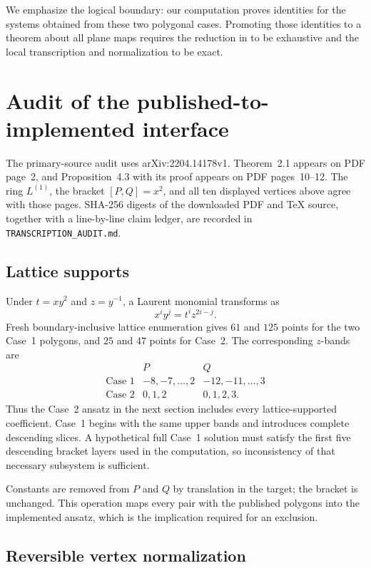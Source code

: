 \documentclass[11pt,a4paper]{article}
\theoremstyle{remark}
\begin{document}
We emphasize the logical boundary: our computation proves identities for the systems obtained from these two polygonal cases. Promoting those identities to a theorem about all plane maps requires the reduction in \cite{GGHV2022} to be exhaustive and the local transcription and normalization to be exact.

\section{Audit of the published-to-implemented interface}

The primary-source audit uses arXiv:2204.14178v1. Theorem~2.1 appears on PDF page~2, and Proposition~4.3 with its proof appears on PDF pages~10--12. The ring $L^{(1)}$, the bracket $[P,Q]=x^2$, and all ten displayed vertices above agree with those pages. SHA-256 digests of the downloaded PDF and TeX source, together with a line-by-line claim ledger, are recorded in \texttt{TRANSCRIPTION\_AUDIT.md}.

\subsection{Lattice supports}

Under $t=xy^2$ and $z=y^{-1}$, a Laurent monomial transforms as
\[
x^iy^j=t^iz^{2i-j}.
\]
Fresh boundary-inclusive lattice enumeration gives $61$ and $125$ points for the two Case~1 polygons, and $25$ and $47$ points for Case~2. The corresponding $z$-bands are
\[
\begin{array}{c|cc}
&P&Q\\ \hline
\text{Case 1}&-8,-7,\ldots,2&-12,-11,\ldots,3\\
\text{Case 2}&0,1,2&0,1,2,3.
\end{array}
\]
Thus the Case~2 ansatz in the next section includes every lattice-supported coefficient. Case~1 begins with the same upper bands and introduces complete descending slices. A hypothetical full Case~1 solution must satisfy the first five descending bracket layers used in the computation, so inconsistency of that necessary subsystem is sufficient.

Constants are removed from $P$ and $Q$ by translation in the target; the bracket is unchanged. This operation maps every pair with the published polygons into the implemented ansatz, which is the implication required for an exclusion.

\subsection{Reversible vertex normalization}
\end{document}
